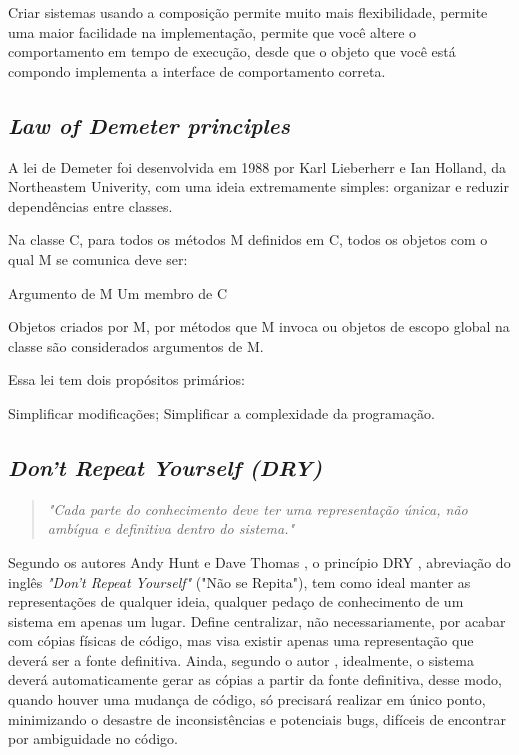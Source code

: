 \documentclass[12pt]{article}
\begin{document}
Criar sistemas usando a composição permite muito mais flexibilidade, permite uma maior facilidade na implementação, permite que você altere o comportamento em tempo de execução, desde que o objeto que você está compondo implementa a interface de comportamento correta.


\subsection{\textit{Law of Demeter principles}} \label{sec:law_of_demeter}

A lei de Demeter foi desenvolvida em 1988 por Karl Lieberherr e Ian Holland, da Northeastem Univerity, com uma ideia extremamente simples: organizar e reduzir dependências entre classes.

Na classe C, para todos os métodos M definidos em C, todos os objetos com o qual M se comunica deve ser:

    Argumento de M
    Um membro de C

Objetos criados por M, por métodos que M invoca ou objetos de escopo global na classe são considerados argumentos de M.

Essa lei tem dois propósitos primários:

    Simplificar modificações;
    Simplificar a complexidade da programação.


\subsection{\textit{Don't Repeat Yourself (DRY)}} \label{sec:dey}

\begin{quote}
\textit{"Cada parte do conhecimento deve ter uma representação única, não ambígua e definitiva dentro do sistema."}
\end{quote}

Segundo os autores Andy Hunt e Dave Thomas \cite{KEEP_IT_DRY_SHY}, o princípio DRY \cite{THE_PRAGMATIC_PROGRAMMER}, abreviação do inglês \textit{"Don't Repeat Yourself"} ("Não se Repita"), tem como ideal manter as representações de qualquer ideia, qualquer pedaço de conhecimento de um sistema em apenas um lugar.
Define centralizar, não necessariamente, por acabar com cópias físicas de código, mas visa existir apenas uma representação que deverá ser a fonte definitiva.
Ainda, segundo o autor \cite{KEEP_IT_DRY_SHY}, idealmente, o sistema deverá automaticamente gerar as cópias a partir da fonte definitiva, desse modo, quando houver uma mudança de código, só precisará realizar em único ponto, minimizando o desastre de inconsistências e potenciais bugs, difíceis de encontrar por ambiguidade no código.
\end{document}
